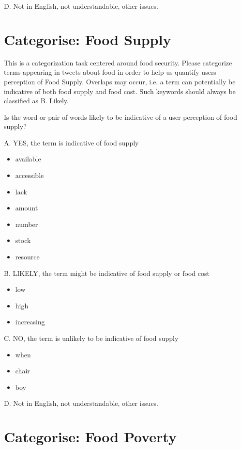 D. Not in English, not understandable, other issues.


\section{Categorise: Food Supply}

This is a categorization task centered around food security. Please categorize terms appearing in tweets about food in order to help us quantify users perception of Food Supply. Overlaps may occur, i.e. a term can potentially be indicative of both food supply and food cost. Such keywords should always be classified as B. Likely.

Is the word or pair of words likely to be indicative of a user perception of food supply?


A. YES, the term is indicative of food supply


\begin{itemize}
  \item available 
  \item accessible 
    \item lack 
  \item amount 
  \item number 
   \item stock 
   \item resource 
\end{itemize}

B. LIKELY, the term might be indicative of food supply or food cost
\begin{itemize}
  \item low
  \item high 
  \item increasing  
\end{itemize}

C. NO, the term is unlikely to be indicative of food supply 
\begin{itemize}
  \item when
  \item chair
  \item boy
\end{itemize}

D. Not in English, not understandable, other issues.

\newpage

\section{Categorise: Food Poverty}


